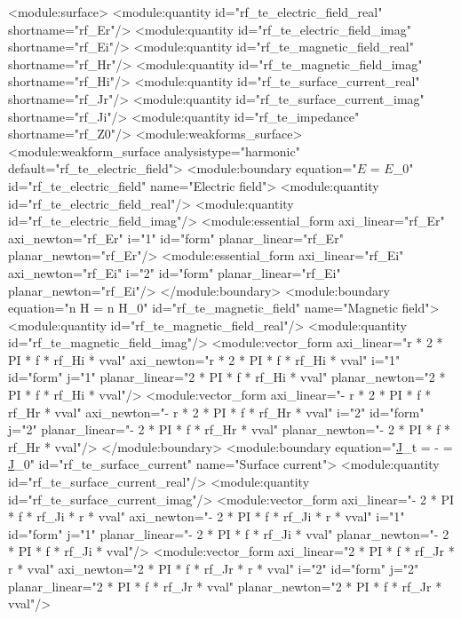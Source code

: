 \documentclass[12pt,a4paper,oneside]{article}
\numberwithin{equation}{section} %
\numberwithin{figure}{section} %
\numberwithin{table}{section} %
\newcommand{\faz}[1]{{\underline{#1}}} %
\newcommand{\vecfaz}[1]{\mbox{\underline{\boldmath$#1$}}} %
\begin{document}
\small\begin{spverbatim}
  <module:surface>
    <module:quantity id="rf_te_electric_field_real" shortname="rf_Er"/>
    <module:quantity id="rf_te_electric_field_imag" shortname="rf_Ei"/>
    <module:quantity id="rf_te_magnetic_field_real" shortname="rf_Hr"/>
    <module:quantity id="rf_te_magnetic_field_imag" shortname="rf_Hi"/>
    <module:quantity id="rf_te_surface_current_real" shortname="rf_Jr"/>
    <module:quantity id="rf_te_surface_current_imag" shortname="rf_Ji"/>
    <module:quantity id="rf_te_impedance" shortname="rf_Z0"/>
    <module:weakforms_surface>
      <module:weakform_surface analysistype="harmonic" default="rf_te_electric_field">
        <module:boundary equation="\vecfaz{E} = \vecfaz{E}_0" id="rf_te_electric_field" name="Electric field">
          <module:quantity id="rf_te_electric_field_real"/>
          <module:quantity id="rf_te_electric_field_imag"/>
          <module:essential_form axi_linear="rf_Er" axi_newton="rf_Er" i="1" id="form" planar_linear="rf_Er" planar_newton="rf_Er"/>
          <module:essential_form axi_linear="rf_Ei" axi_newton="rf_Ei" i="2" id="form" planar_linear="rf_Ei" planar_newton="rf_Ei"/>
        </module:boundary>
        <module:boundary equation="n \times H = n \times H_0" id="rf_te_magnetic_field" name="Magnetic field">
          <module:quantity id="rf_te_magnetic_field_real"/>
          <module:quantity id="rf_te_magnetic_field_imag"/>
          <module:vector_form axi_linear="r * 2 * PI * f * rf_Hi * vval" axi_newton="r * 2 * PI * f * rf_Hi * vval" i="1" id="form" j="1" planar_linear="2 * PI * f * rf_Hi * vval" planar_newton="2 * PI * f * rf_Hi * vval"/>
          <module:vector_form axi_linear="- r * 2 * PI * f * rf_Hr * vval" axi_newton="- r * 2 * PI * f * rf_Hr * vval" i="2" id="form" j="2" planar_linear="- 2 * PI * f * rf_Hr * vval" planar_newton="- 2 * PI * f * rf_Hr * vval"/>
        </module:boundary>
        <module:boundary equation="\faz{J}_{t} = -  \frac{\partial \vecfaz{E}}{\partial n_0} = \faz{J}_0" id="rf_te_surface_current" name="Surface current">
          <module:quantity id="rf_te_surface_current_real"/>
          <module:quantity id="rf_te_surface_current_imag"/>
          <module:vector_form axi_linear="- 2 * PI * f * rf_Ji * r * vval" axi_newton="- 2 * PI * f * rf_Ji * r * vval" i="1" id="form" j="1" planar_linear="- 2 * PI * f * rf_Ji * vval" planar_newton="- 2 * PI * f * rf_Ji * vval"/>
          <module:vector_form axi_linear="2 * PI * f * rf_Jr * r * vval" axi_newton="2 * PI * f * rf_Jr * r * vval" i="2" id="form" j="2" planar_linear="2 * PI * f * rf_Jr * vval" planar_newton="2 * PI * f * rf_Jr * vval"/>

\end{spverbatim}
\end{document}
